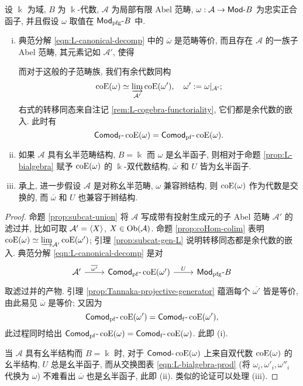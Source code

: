 \begin{theorem}\label{prop:Tannaka-aux1}
	设 $\Bbbk$ 为域, $B$ 为 $\Bbbk$-代数, $\mathcal{A}$ 为局部有限 Abel 范畴, $\omega: \mathcal{A} \to \mathsf{Mod}\text{-}B$ 为忠实正合函子, 并且假设 $\omega$ 取值在 $\mathsf{Mod}_{\mathrm{pfg}}\text{-}B$ 中.
	\begin{enumerate}[(i)]
		\item 典范分解 \eqref{eqn:L-canonical-decomp} 中的 $\overline{\omega}$ 是范畴等价, 而且存在 $\mathcal{A}$ 的一族子 Abel 范畴, 其元素记如 $\mathcal{A}'$, 使得
		而对于这般的子范畴族, 我们有余代数同构
		\[ \operatorname{coE}(\omega) \simeq \varinjlim_{\mathcal{A}'} \operatorname{coE}(\omega'), \quad \omega' := \omega|_{\mathcal{A}'}; \]
		右式的转移同态来自注记 \ref{rem:L-cogebra-functoriality}, 它们都是余代数的嵌入. 此时有
		\[ \mathsf{Comod}_{\mathrm{f}}\text{-}\operatorname{coE}(\omega) = \mathsf{Comod}_{\mathrm{pf}}\text{-}\operatorname{coE}(\omega). \]
		
		\item 如果 $\mathcal{A}$ 具有幺半范畴结构, $B = \Bbbk$ 而 $\omega$ 是幺半函子, 则相对于命题 \ref{prop:L-bialgebra} 赋予 $\operatorname{coE}(\omega)$ 的 $\Bbbk$-双代数结构, $\overline{\omega}$ 和 $U$ 皆为幺半函子.
		\item 承上, 进一步假设 $\mathcal{A}$ 是对称幺半范畴, $\omega$ 兼容辫结构, 则 $\operatorname{coE}(\omega)$ 作为代数是交换的, 而 $\overline{\omega}$ 和 $U$ 也兼容于辫结构.
	\end{enumerate}
\end{theorem}
\begin{proof}
	命题 \ref{prop:subcat-union} 将 $\mathcal{A}$ 写成带有投射生成元的子 Abel 范畴 $\mathcal{A}'$ 的滤过并, 比如可取 $\mathcal{A}' = \left\langle X \right\rangle$, $X \in \operatorname{Ob}(\mathcal{A})$. 命题 \ref{prop:coHom-colim} 表明 $\operatorname{coE}(\omega) \simeq \varinjlim_{\mathcal{A}'} \operatorname{coE}(\omega')$; 引理 \ref{prop:subcat-gen-L} 说明转移同态都是余代数的嵌入. 典范分解 \eqref{eqn:L-canonical-decomp} 是对
	\[\begin{tikzcd}
		\mathcal{A}' \arrow[r, "{\overline{\omega'}}"] & \catesubd{Comod}{\mathrm{pf}}\coEnd(\omega') \arrow[r, "U"] & \catesubd{Mod}{\mathrm{pfg}}B
	\end{tikzcd}\]
	取滤过并的产物. 引理 \ref{prop:Tannaka-projective-generator} 蕴涵每个 $\overline{\omega'}$ 皆是等价, 由此易见 $\overline{\omega}$ 是等价; 又因为
	\[ \mathsf{Comod}_{\mathrm{pf}}\text{-}\operatorname{coE}(\omega') = \mathsf{Comod}_{\mathrm{f}}\text{-}\operatorname{coE}(\omega'), \]
	此过程同时给出 $\mathsf{Comod}_{\mathrm{pf}}\text{-}\operatorname{coE}(\omega) = \mathsf{Comod}_{\mathrm{f}}\text{-}\operatorname{coE}(\omega)$. 此即 (i).
	
	当 $\mathcal{A}$ 具有幺半结构而 $B = \Bbbk$ 时, 对于 $\mathsf{Comod}\text{-}\operatorname{coE}(\omega)$ 上来自双代数 $\operatorname{coE}(\omega)$ 的幺半结构, $U$ 总是幺半函子, 而从交换图表 \eqref{eqn:L-bialgebra-prod} (将 $\omega_i, \omega'_i, \omega''_i$ 代换为 $\omega$) 不难看出 $\overline{\omega}$ 也是幺半函子, 此即 (ii). 类似的论证可以处理 (iii).
\end{proof}

